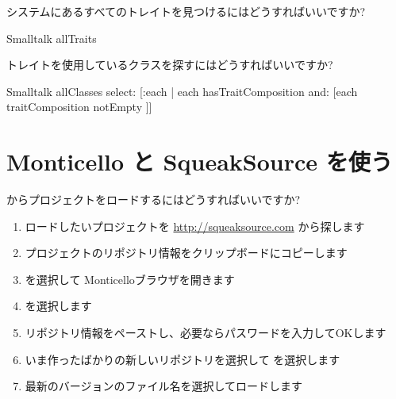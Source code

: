 \documentclass[a4paper,10pt,twoside]{book}
\begin{document}
\begin{faq}
システムにあるすべてのトレイトを見つけるにはどうすればいいですか?
\end{faq}
\answer
\begin{code}{}
Smalltalk allTraits
\end{code}

\begin{faq}
トレイトを使用しているクラスを探すにはどうすればいいですか?
\end{faq}
\answer
\begin{code}{}
Smalltalk allClasses select: [:each | each hasTraitComposition and: [each traitComposition notEmpty ]]
\end{code}

\section{Monticello と SqueakSource を使う}

\begin{faq}
 からプロジェクトをロードするにはどうすればいいですか?
\end{faq}
\answer
\begin{enumerate}
  \item ロードしたいプロジェクトを \url{http://squeaksource.com} から探します
  \item プロジェクトのリポジトリ情報をクリップボードにコピーします
  \item {} を選択して Monticelloブラウザを開きます
  \item {} を選択します
  \item リポジトリ情報をペーストし、必要ならパスワードを入力してOKします
  \item いま作ったばかりの新しいリポジトリを選択して  を選択します
  \item 最新のバージョンのファイル名を選択してロードします
\end{enumerate}
\end{document}
